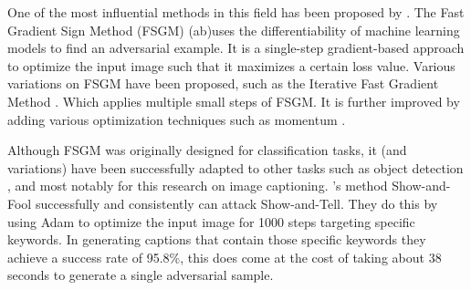 One of the most influential methods in this field has been proposed by \citeauthor{goodfellow2015explaining}. The Fast Gradient Sign Method (FSGM) (ab)uses the differentiability of machine learning models to find an adversarial example. It is a single-step gradient-based approach to optimize the input image such that it maximizes a certain loss value. Various variations on FSGM have been proposed, such as the Iterative Fast Gradient Method \cite{Kurakin}. Which applies multiple small steps of FSGM. It is further improved by adding various optimization techniques such as momentum \cite{9237700}.

Although FSGM was originally designed for classification tasks, it (and variations) have been successfully adapted to other tasks such as object detection \cite{AdversarialAttacksOnFace,AdversarialFasterRCNN,DBLP:journals/corr/abs-1907-10310}, and most notably for this research on image captioning\cite{Hongge}. \citeauthor{Hongge}'s method Show-and-Fool successfully and consistently can attack Show-and-Tell\cite{showandtell}. They do this by using Adam\cite{kingma2017adam} to optimize the input image for 1000 steps targeting specific keywords. In generating captions that contain those specific keywords they achieve a success rate of 95.8\%, this does come at the cost of taking about 38 seconds to generate a single adversarial sample.

